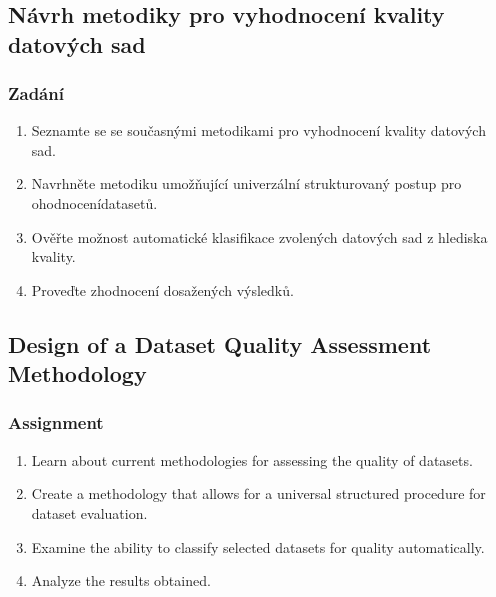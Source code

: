 \chapter*{}

\section*{Návrh metodiky pro vyhodnocení kvality datových sad}

\subsection*{Zadání}

\begin{enumerate}
    \item Seznamte se se současnými metodikami pro vyhodnocení kvality datových sad.
    \item Navrhněte metodiku umožňující univerzální strukturovaný postup pro ohodnocení\linebreak datasetů.
    \item Ověřte možnost automatické klasifikace zvolených datových sad z hlediska kvality.
    \item Proveďte zhodnocení dosažených výsledků.
\end{enumerate}

\vspace{3.5cm}

\section*{Design of a Dataset Quality Assessment Methodology}

\subsection*{Assignment}

\begin{enumerate}
    \item Learn about current methodologies for assessing the quality of datasets.
    \item Create a methodology that allows for a universal structured procedure for dataset evaluation.
    \item Examine the ability to classify selected datasets for quality automatically.
    \item Analyze the results obtained.
\end{enumerate}
